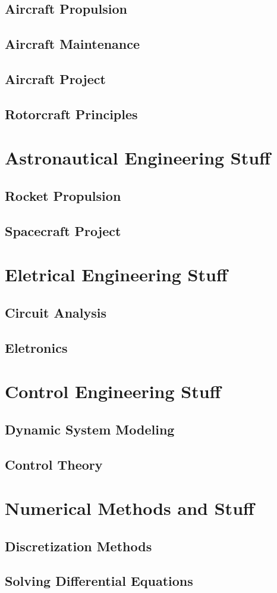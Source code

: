 \section{Aircraft Propulsion}
\section{Aircraft Maintenance}
\section{Aircraft Project}
\section{Rotorcraft Principles}

\chapter{Astronautical Engineering Stuff}

\section{Rocket Propulsion}
\section{Spacecraft Project}

\chapter{Eletrical Engineering Stuff}

\section{Circuit Analysis}
\section{Eletronics}

\chapter{Control Engineering Stuff}

\section{Dynamic System Modeling}
\section{Control Theory}

\chapter{Numerical Methods and Stuff}

\section{Discretization Methods}
\section{Solving Differential Equations}
